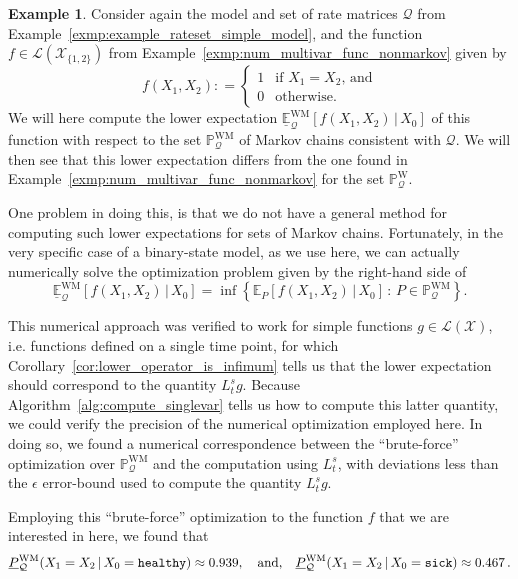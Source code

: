 \documentclass[10pt,a4paper]{paper}
\theoremstyle{definition}
\newtheorem{exmp}{Example}%
\newcommand{\states}{\mathcal{X}}
\newcommand{\processes}{\mathbb{P}}
\newcommand{\wprocesses}{\processes^{\mathrm{W}}}
\newcommand{\wmprocesses}{\processes^{\mathrm{WM}}}
\newcommand{\gambles}{\mathcal{L}}
\newcommand{\gamblesX}{\gambles(\states)}
\newcommand{\rateset}{\mathcal{Q}}
\newcommand{\coloneqq}{:\!=}
\begin{document}
\begin{exmp} \label{exmp:num_counterexample_markov}
Consider again the model and set of rate matrices $\rateset$ from Example~\ref{exmp:example_rateset_simple_model}, and the function $f\in\gambles(\states_{\{1,2\}})$ from Example~\ref{exmp:num_multivar_func_nonmarkov} given by
\begin{equation*}
f(X_1,X_2) \coloneqq \left\{\begin{array}{ll}
1 & \text{if $X_1 = X_2$, and} \\
0 & \text{otherwise.}
\end{array}\right.
\end{equation*}
We will here compute the lower expectation $\underline{\mathbb{E}}_\rateset^{\mathrm{WM}}[f(X_1,X_2)\,\vert\,X_0]$ of this function with respect to the set $\wmprocesses_\rateset$ of Markov chains consistent with $\rateset$. We will then see that this lower expectation differs from the one found in Example~\ref{exmp:num_multivar_func_nonmarkov} for the set $\wprocesses_\rateset$.

One problem in doing this, is that we do not have a general method for computing such lower expectations for sets of Markov chains. Fortunately, in the very specific case of a binary-state model, as we use here, we can actually numerically solve the optimization problem given by the right-hand side of
\begin{equation*}
\underline{\mathbb{E}}_\rateset^{\mathrm{WM}}[f(X_1,X_2)\,\vert\,X_0] = \inf\left\{ \mathbb{E}_P[f(X_1,X_2)\,\vert\,X_0]\,:\,P\in\wmprocesses_\rateset\right\}.
\end{equation*}

This numerical approach was verified to work for simple functions $g\in\gamblesX$, i.e. functions defined on a single time point, for which Corollary~\ref{cor:lower_operator_is_infimum} tells us that the lower expectation should correspond to the quantity $L_t^sg$. Because Algorithm~\ref{alg:compute_singlevar} tells us how to compute this latter quantity, we could verify the precision of the numerical optimization employed here. In doing so, we found a numerical correspondence between the ``brute-force'' optimization over $\wmprocesses_\rateset$ and the computation using $L_t^s$, with deviations less than the $\epsilon$ error-bound used to compute the quantity $L_t^sg$.

Employing this ``brute-force'' optimization to the function $f$ that we are interested in here, we found that
\begin{align*}
\underline{P}_{\rateset}^{\mathrm{WM}}(X_1 = X_2\,\vert\,X_0=\text{{\tt healthy}}) \approx 0.939,\quad\text{and,}\quad \underline{P}_{\rateset}^{\mathrm{WM}}(X_1 = X_2\,\vert\,X_0=\text{{\tt sick}}) \approx 0.467\,.
\end{align*}


\end{exmp}
\end{document}
